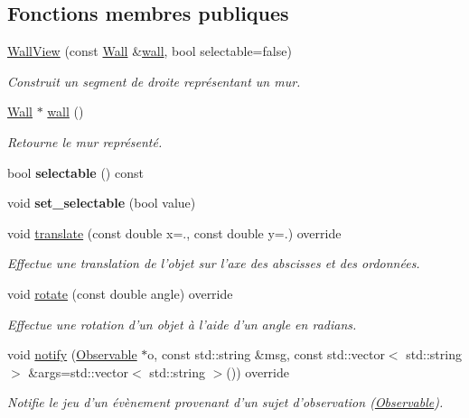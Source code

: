 \subsection*{Fonctions membres publiques}
\begin{DoxyCompactItemize}
\item 
\hyperlink{classWallView_acd55794debfd67a8f2b9088d3fb2e0dc}{Wall\+View} (const \hyperlink{classWall}{Wall} \&\hyperlink{classWallView_af93a05e8e527a55158707802c2f16911}{wall}, bool selectable=false)
\begin{DoxyCompactList}\small\item\em Construit un segment de droite représentant un mur. \end{DoxyCompactList}\item 
\hyperlink{classWall}{Wall} $\ast$ \hyperlink{classWallView_af93a05e8e527a55158707802c2f16911}{wall} ()
\begin{DoxyCompactList}\small\item\em Retourne le mur représenté. \end{DoxyCompactList}\item 
\hypertarget{classWallView_a674eb428edf9826a41616bc3f8618044}{bool {\bfseries selectable} () const }\label{classWallView_a674eb428edf9826a41616bc3f8618044}

\item 
\hypertarget{classWallView_ab47e5401e6addcc68d84f702800cc282}{void {\bfseries set\+\_\+selectable} (bool value)}\label{classWallView_ab47e5401e6addcc68d84f702800cc282}

\item 
void \hyperlink{classWallView_addb0495d120d6dfccd37cc0d65f32660}{translate} (const double x=., const double y=.) override
\begin{DoxyCompactList}\small\item\em Effectue une translation de l’objet sur l’axe des abscisses et des ordonnées. \end{DoxyCompactList}\item 
void \hyperlink{classWallView_a418bfa06482ecd61cd07533de32be0f1}{rotate} (const double angle) override
\begin{DoxyCompactList}\small\item\em Effectue une rotation d’un objet à l’aide d’un angle en radians. \end{DoxyCompactList}\item 
void \hyperlink{classWallView_a68050e9027589cc7d1ab592e1cd8003c}{notify} (\hyperlink{classObservable}{Observable} $\ast$o, const std\+::string \&msg, const std\+::vector$<$ std\+::string $>$ \&args=std\+::vector$<$ std\+::string $>$()) override
\begin{DoxyCompactList}\small\item\em Notifie le jeu d'un évènement provenant d'un sujet d'observation (\hyperlink{classObservable}{Observable}). \end{DoxyCompactList}\end{DoxyCompactItemize}
